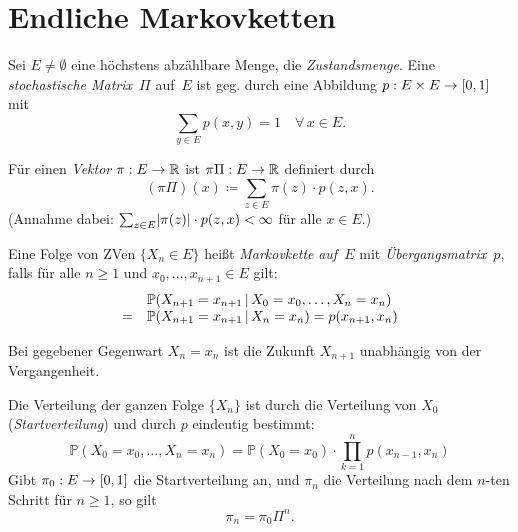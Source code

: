 \documentclass{cheat-sheet}
\renewcommand{\P}{\mathbb{P}} %
\begin{document}
\raggedcolumns %


\section{Endliche Markovketten}

\begin{setting}
  Sei $E \neq \emptyset$ eine höchstens abzählbare Menge, die \textit{Zustandsmenge}.
  Eine \emph{stochastische Matrix}~$\Pi$ auf~$E$ ist geg. durch eine Abbildung $p : E \times E \to \left[ 0, 1 \right]$ mit
  \[
    {\sum}_{y \in E} p(x, y) = 1 \quad
    \forall\,x \in E.
  \]
\end{setting}

\begin{defn}
  Für einen \textit{Vektor} $\pi : E \to \mathbb{R}$ ist $\pi \Pi : E \to \mathbb{R}$ definiert durch
  \[
    (\pi \Pi)(x) \coloneqq {\sum}_{z \in E} \pi(z) \cdot p(z, x).
  \]
  (Annahme dabei: ${\sum}_{z \in E} \abs{\pi(z)} \cdot p(z, x) < \infty$ für alle $x \in E$.)
\end{defn}

\begin{defn}
  Eine Folge von ZVen $\{ X_n \in E \}$ heißt \emph{Markovkette} \textit{auf~$E$} mit \textit{Übergangsmatrix}~$p$, falls für alle $n \geq 1$ und $x_0, \ldots, x_{n+1} \in E$ gilt:
  \[
    \begin{array}{r l}
      & \P(X_{n+1} = x_{n+1} \,|\, X_0=x_0, \ldots, X_n=x_n) \\
      = & \P(X_{n+1} = x_{n+1} \,|\, X_n=x_n)
      = p(x_{n+1}, x_n)
    \end{array}
  \]
\end{defn}

\begin{interp}
  Bei gegebener Gegenwart $X_n = x_n$ ist die Zukunft $X_{n+1}$ unabhängig von der Vergangenheit.
\end{interp}

\begin{bem}
  Die Verteilung der ganzen Folge $\{ X_n \}$ ist durch die Verteilung von $X_0$ (\textit{Startverteilung}) und durch $p$ eindeutig bestimmt:
  \[
    \P(X_0=x_0, \ldots, X_n=x_n) = \P(X_0=x_0) \cdot {\prod}_{k=1}^n p(x_{n-1}, x_n)
  \]
  Gibt $\pi_0 : E \to \left[ 0, 1 \right]$ die Startverteilung an, und $\pi_n$ die Verteilung nach dem $n$-ten Schritt für $n \geq 1$, so gilt
  \[
    \pi_n = \pi_0 \Pi^n.
  \]
\end{bem}
\end{document}
